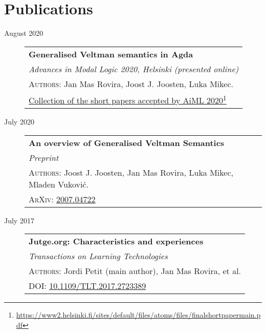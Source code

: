 \documentclass[11pt]{article}
\newcommand{\fnlink}[2]{\href{#1}{#2}\footnote{\url{#1}}}
\begin{document}
\section{Publications}
\begin{description}
\item[August 2020]
  \begin{minipage}{\textwidth}
    \begin{tabular}{|p{12cm}}
      \textbf{Generalised Veltman semantics in Agda} \\
      \emph{Advances in Modal Logic 2020, Helsinki (presented online)} \\
      \textsc{Authors}: Jan Mas Rovira, Joost J. Joosten, Luka Mikec. \\
      \fnlink{https://www2.helsinki.fi/sites/default/files/atoms/files/finalshortpapermain.pdf}{Collection of the short papers accepted by AiML 2020} \\
    \end{tabular}
  \end{minipage}

\item[July 2020]
  \begin{minipage}{\textwidth}
    \begin{tabular}{|p{12cm}}
      \textbf{An overview of Generalised Veltman Semantics} \\
      \emph{Preprint} \\
      \textsc{Authors}: Joost J. Joosten, Jan Mas Rovira, Luka Mikec, Mladen Vuković. \\
      \textsc{ArXiv}: \href{https://arxiv.org/abs/2007.04722}{2007.04722} \\
    \end{tabular}
  \end{minipage}


\item[July 2017]
  \begin{minipage}{\textwidth}
    \begin{tabular}{|p{12cm}}
      \textbf{Jutge.org: Characteristics and experiences} \\
      \emph{Transactions on Learning Technologies} \\
      \textsc{Authors}: Jordi Petit (main author), Jan Mas Rovira, et al. \\
      \textsc{DOI}: \href{https://doi.org/10.1109/TLT.2017.2723389}{10.1109/TLT.2017.2723389} \\
    \end{tabular}
  \end{minipage}

\end{description}
\end{document}
